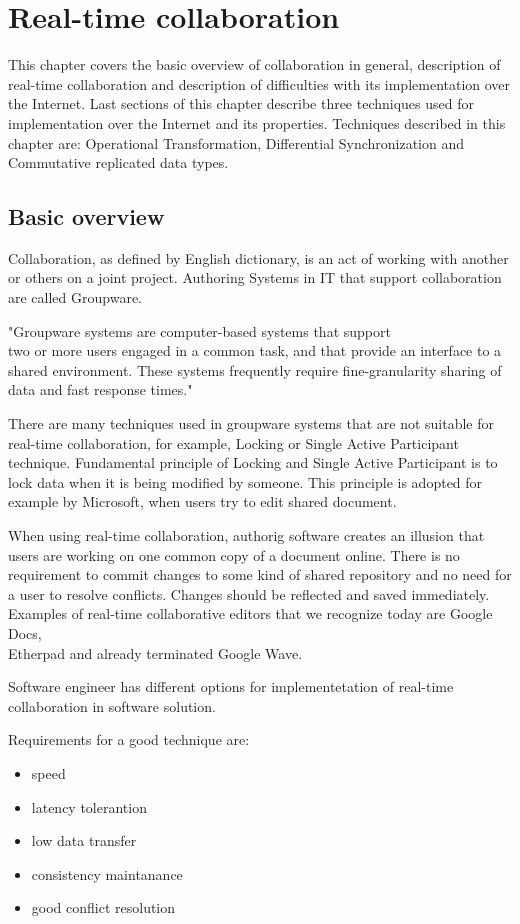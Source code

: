\documentclass[12pt,oneside]{fithesis2}
\begin{document}
\chapter{Real-time collaboration}
This chapter covers the basic overview of collaboration in general, description of real-time collaboration and description of difficulties with its implementation over the Internet. Last sections of this chapter describe three techniques used for implementation over the Internet and its properties. Techniques described in this chapter are: Operational Transformation, Differential Synchronization and Commutative replicated data types.
\section{Basic overview}
Collaboration, as defined by English dictionary, is an act of working with another or others on a joint project. Authoring Systems in IT that support collaboration are called Groupware. \par "Groupware systems are computer-based systems that support \\two or more users engaged in a common task, and that provide an interface to a shared environment. These systems frequently require fine-granularity sharing of data and fast response times." \cite{Ellis} \par There are many techniques used in groupware systems that are not suitable for real-time collaboration, for example, Locking or Single Active Participant technique. Fundamental principle of Locking and Single Active Participant is to lock data when it is being modified by someone. This principle is adopted for example by Microsoft, when users try to edit shared document. \par When using real-time collaboration, authorig software creates an illusion that users are working on one common copy of a document online. There is no requirement to commit changes to some kind of shared repository and no need for a user to resolve conflicts. Changes should be reflected and saved immediately. Examples of real-time collaborative editors that we recognize today are Google Docs,\\ Etherpad and already terminated Google Wave. \par Software engineer has different options for implementetation of real-time collaboration in software solution. \par Requirements for a good technique are: 
\begin{itemize}
\item speed
\item latency tolerantion
\item low data transfer
\item consistency maintanance
\item good conflict resolution
\end{itemize}
\end{document}
